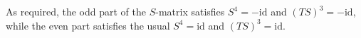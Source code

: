 As required, the odd part of the $S$-matrix satisfies $S^4 = -\text{id}$ and $(TS)^3 = -\text{id}$, 
while the even part satisfies the usual $S^4 = \text{id}$ and $(TS)^3 = \text{id}$. 

